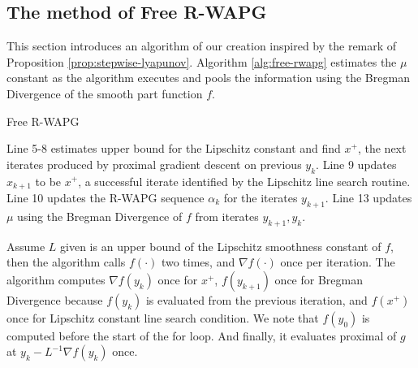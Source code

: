 \documentclass[12pt]{article}
\begin{document}
\subsection{The method of Free R-WAPG}
    This section introduces an algorithm of our creation inspired by the remark of Proposition \ref{prop:stepwise-lyapunov}. 
    Algorithm \ref{alg:free-rwapg} estimates the $\mu$ constant as the algorithm executes and pools the information using the Bregman Divergence of the smooth part function $f$. 
    \begin{algorithm}
        \begin{algorithmic}[1]
        {\footnotesize
            \ENDWHILE
        \ENDFOR
        }
        \end{algorithmic}
        \caption{Free R-WAPG}
        \label{alg:free-rwapg}
    \end{algorithm}
    \par
    Line 5-8 estimates upper bound for the Lipschitz constant and find $x^+$, the next iterates produced by proximal gradient descent on previous $y_k$.
    Line 9 updates $x_{k + 1}$ to be $x^+$, a successful iterate identified by the Lipschitz line search routine. 
    Line 10 updates the R-WAPG sequence $\alpha_k$ for the iterates $y_{k + 1}$. 
    Line 13 updates $\mu$ using the Bregman Divergence of $f$ from iterates $y_{k + 1}, y_k$. 
    \par
    Assume $L$ given is an upper bound of the Lipschitz smoothness constant of $f$, then the algorithm calls $f(\cdot)$ two times, and $\nabla f(\cdot)$ once per iteration. 
    The algorithm computes $\nabla f(y_k)$ once for $x^+$, $f(y_{k + 1})$ once for Bregman Divergence because $f(y_{k})$ is evaluated from the previous iteration, and $f(x^+)$ once for Lipschitz constant line search condition. 
    We note that $f(y_0)$ is computed before the start of the for loop. 
    And finally, it evaluates proximal of $g$ at $y_k - L^{-1}\nabla f(y_k)$ once. 
\end{document}
